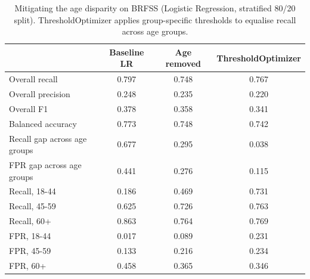 \begin{table}[h]
\caption{Mitigating the age disparity on BRFSS (Logistic Regression, stratified 80/20 split). ThresholdOptimizer applies group-specific thresholds to equalise recall across age groups.}
\label{tab:mitigation}
\small\setlength\tabcolsep{4pt}
\begin{tabular}{lccc}
\toprule
 & Baseline LR & Age removed & ThresholdOptimizer\\
\midrule
Overall recall & 0.797 & 0.748 & 0.767\\
Overall precision & 0.248 & 0.235 & 0.220\\
Overall F1 & 0.378 & 0.358 & 0.341\\
Balanced accuracy & 0.773 & 0.748 & 0.742\\
Recall gap across age groups & 0.677 & 0.295 & 0.038\\
FPR gap across age groups & 0.441 & 0.276 & 0.115\\
Recall, 18-44 & 0.186 & 0.469 & 0.731\\
Recall, 45-59 & 0.625 & 0.726 & 0.763\\
Recall, 60+ & 0.863 & 0.764 & 0.769\\
FPR, 18-44 & 0.017 & 0.089 & 0.231\\
FPR, 45-59 & 0.133 & 0.216 & 0.234\\
FPR, 60+ & 0.458 & 0.365 & 0.346\\
\bottomrule
\end{tabular}
\end{table}